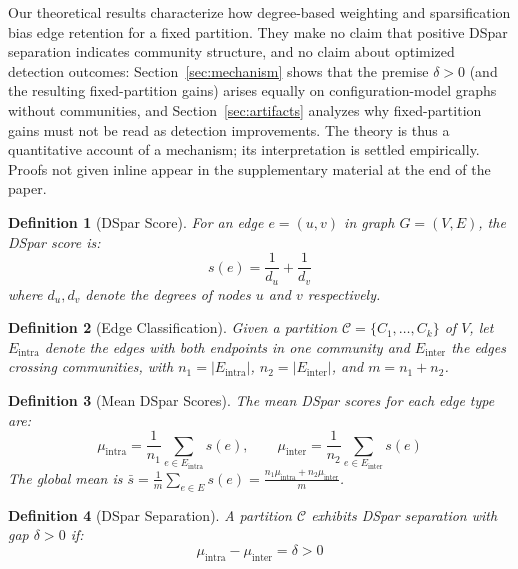 \documentclass[10pt,journal,compsoc]{IEEEtran}
\newtheorem{definition}{Definition}
\begin{document}
Our theoretical results characterize how degree-based weighting and sparsification bias edge retention for a fixed partition. They make no claim that positive DSpar separation indicates community structure, and no claim about optimized detection outcomes: Section~\ref{sec:mechanism} shows that the premise $\delta>0$ (and the resulting fixed-partition gains) arises equally on configuration-model graphs without communities, and Section~\ref{sec:artifacts} analyzes why fixed-partition gains must not be read as detection improvements. The theory is thus a quantitative account of a mechanism; its interpretation is settled empirically.
Proofs not given inline appear in the supplementary material at the end of the paper.

\begin{definition}[DSpar Score]
For an edge $e = (u,v)$ in graph $G = (V, E)$, the \emph{DSpar score} is:
\begin{equation}
s(e) = \frac{1}{d_u} + \frac{1}{d_v}
\end{equation}
where $d_u, d_v$ denote the degrees of nodes $u$ and $v$ respectively.
\end{definition}

\begin{definition}[Edge Classification]
Given a partition $\mathcal{C} = \{C_1, \ldots, C_k\}$ of $V$, let $E_{\text{intra}}$ denote the edges with both endpoints in one community and $E_{\text{inter}}$ the edges crossing communities, with $n_1 = |E_{\text{intra}}|$, $n_2 = |E_{\text{inter}}|$, and $m = n_1 + n_2$.
\end{definition}

\begin{definition}[Mean DSpar Scores]
The mean DSpar scores for each edge type are:
\begin{equation}
\mu_{\text{intra}} = \frac{1}{n_1} \sum_{e \in E_{\text{intra}}} s(e), \qquad
\mu_{\text{inter}} = \frac{1}{n_2} \sum_{e \in E_{\text{inter}}} s(e)
\end{equation}
The global mean is $\bar{s} = \frac{1}{m}\sum_{e \in E} s(e) = \frac{n_1 \mu_{\text{intra}} + n_2 \mu_{\text{inter}}}{m}$.
\end{definition}

\begin{definition}[DSpar Separation]
A partition $\mathcal{C}$ exhibits \emph{DSpar separation} with gap $\delta > 0$ if:
\begin{equation}
\mu_{\text{intra}} - \mu_{\text{inter}} = \delta > 0
\end{equation}
\end{definition}
\end{document}
